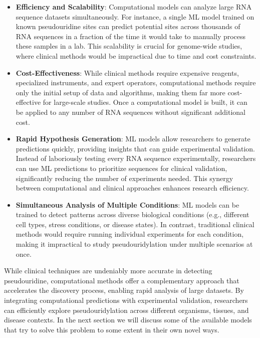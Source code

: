     \begin{itemize}
      \item \textbf{Efficiency and Scalability}: Computational models can analyze large RNA sequence datasets simultaneously.
      For instance, a single ML model trained on known pseudouridine sites can predict potential sites across thousands of RNA sequences in a fraction of the time it would take to manually process these samples in a lab.
      This scalability is crucial for genome-wide studies, where clinical methods would be impractical due to time and cost constraints.
      \item \textbf{Cost-Effectiveness}: While clinical methods require expensive reagents, specialized instruments, and expert operators, computational methods require only the initial setup of data and algorithms, making them far more cost-effective for large-scale studies.
      Once a computational model is built, it can be applied to any number of RNA sequences without significant additional cost.
      \item \textbf{Rapid Hypothesis Generation}: ML models allow researchers to generate predictions quickly, providing insights that can guide experimental validation.
      Instead of laboriously testing every RNA sequence experimentally, researchers can use ML predictions to prioritize sequences for clinical validation, significantly reducing the number of experiments needed.
      This synergy between computational and clinical approaches enhances research efficiency.
      \item \textbf{Simultaneous Analysis of Multiple Conditions}: ML models can be trained to detect patterns across diverse biological conditions (e.g., different cell types, stress conditions, or disease states).
      In contrast, traditional clinical methods would require running individual experiments for each condition, making it impractical to study pseudouridylation under multiple scenarios at once.
    \end{itemize}

    While clinical techniques are undeniably more accurate in detecting pseudouridine, computational methods offer a complementary approach that accelerates the discovery process, enabling rapid analysis of large datasets.
    By integrating computational predictions with experimental validation, researchers can efficiently explore pseudouridylation across different organisms, tissues, and disease contexts.
    In the next section we will discuss some of the available models that try to solve this problem to some extent in their own novel ways.
